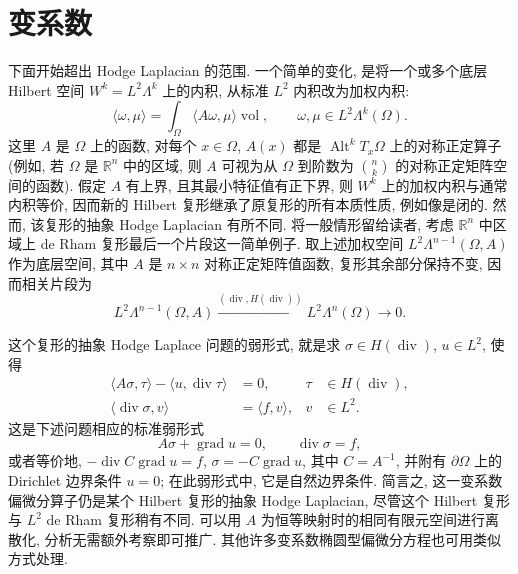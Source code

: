 \section{{变系数}}\label{sec:variable-coefficients}

{下面开始超出 Hodge Laplacian 的范围. 一个简单的变化, 是将一个或多个底层 Hilbert 空间 $W^k=L^2\Lambda^k$ 上的内积, 从标准 $L^2$ 内积改为加权内积:}
\[
\langle\omega,\mu\rangle=\int_\Omega\langle A\omega,\mu\rangle\operatorname{vol},\qquad\omega,\mu\in L^2\Lambda^k(\Omega).
\]
{这里 $A$ 是 $\Omega$ 上的函数, 对每个 $x\in\Omega$, $A(x)$ 都是 $\operatorname{Alt}^kT_x\Omega$ 上的对称正定算子 (例如, 若 $\Omega$ 是 $\mathbb R^n$ 中的区域, 则 $A$ 可视为从 $\Omega$ 到阶数为 $\binom nk$ 的对称正定矩阵空间的函数). 假定 $A$ 有上界, 且其最小特征值有正下界, 则 $W^k$ 上的加权内积与通常内积等价, 因而新的 Hilbert 复形继承了原复形的所有本质性质, 例如像是闭的. 然而, 该复形的抽象 Hodge Laplacian 有所不同. 将一般情形留给读者, 考虑 $\mathbb R^n$ 中区域上 de Rham 复形最后一个片段这一简单例子. 取上述加权空间 $L^2\Lambda^{n-1}(\Omega,A)$ 作为底层空间, 其中 $A$ 是 $n\times n$ 对称正定矩阵值函数, 复形其余部分保持不变, 因而相关片段为}
\begin{equation}\label{eq:weighted-divergence-complex}
L^2\Lambda^{n-1}(\Omega,A)\xrightarrow{(\operatorname{div},H(\operatorname{div}))}L^2\Lambda^n(\Omega)\to0.
\end{equation}

{这个复形的抽象 Hodge Laplace 问题的弱形式, 就是求 $\sigma\in H(\operatorname{div})$, $u\in L^2$, 使得}
\[
\begin{aligned}
\langle A\sigma,\tau\rangle-\langle u,\operatorname{div}\tau\rangle&=0,&\tau&\in H(\operatorname{div}),\\
\langle\operatorname{div}\sigma,v\rangle&=\langle f,v\rangle,&v&\in L^2.
\end{aligned}
\]
{这是下述问题相应的标准弱形式}
\[
A\sigma+\operatorname{grad}u=0,\qquad\operatorname{div}\sigma=f,
\]
{或者等价地, $-\operatorname{div}C\operatorname{grad}u=f$, $\sigma=-C\operatorname{grad}u$, 其中 $C=A^{-1}$, 并附有 $\partial\Omega$ 上的 Dirichlet 边界条件 $u=0$; 在此弱形式中, 它是自然边界条件. 简言之, 这一变系数偏微分算子仍是某个 Hilbert 复形的抽象 Hodge Laplacian, 尽管这个 Hilbert 复形与 $L^2$ de Rham 复形稍有不同. 可以用 $A$ 为恒等映射时的相同有限元空间进行离散化, 分析无需额外考察即可推广. 其他许多变系数椭圆型偏微分方程也可用类似方式处理.}
